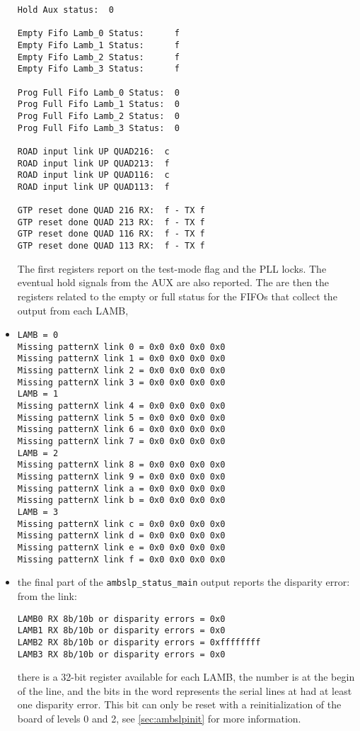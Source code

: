 \documentclass[UKenglish]{latex/atlasdoc}
\begin{document}
\begin{itemize}
\begin{verbatim}
Hold Aux status:  0

Empty Fifo Lamb_0 Status:      f
Empty Fifo Lamb_1 Status:      f
Empty Fifo Lamb_2 Status:      f
Empty Fifo Lamb_3 Status:      f

Prog Full Fifo Lamb_0 Status:  0
Prog Full Fifo Lamb_1 Status:  0
Prog Full Fifo Lamb_2 Status:  0
Prog Full Fifo Lamb_3 Status:  0

ROAD input link UP QUAD216:  c
ROAD input link UP QUAD213:  f
ROAD input link UP QUAD116:  c
ROAD input link UP QUAD113:  f

GTP reset done QUAD 216 RX:  f - TX f
GTP reset done QUAD 213 RX:  f - TX f
GTP reset done QUAD 116 RX:  f - TX f
GTP reset done QUAD 113 RX:  f - TX f
\end{verbatim}
	The first registers
	report on the test-mode flag and the PLL locks. The eventual hold signals from the 
	AUX are also reported. The are then the registers related to the empty or full 
	status for the FIFOs that collect the output from each LAMB, 
	
	\item 
\begin{verbatim}
LAMB = 0
Missing patternX link 0 = 0x0 0x0 0x0 0x0
Missing patternX link 1 = 0x0 0x0 0x0 0x0
Missing patternX link 2 = 0x0 0x0 0x0 0x0
Missing patternX link 3 = 0x0 0x0 0x0 0x0
LAMB = 1
Missing patternX link 4 = 0x0 0x0 0x0 0x0
Missing patternX link 5 = 0x0 0x0 0x0 0x0
Missing patternX link 6 = 0x0 0x0 0x0 0x0
Missing patternX link 7 = 0x0 0x0 0x0 0x0
LAMB = 2
Missing patternX link 8 = 0x0 0x0 0x0 0x0
Missing patternX link 9 = 0x0 0x0 0x0 0x0
Missing patternX link a = 0x0 0x0 0x0 0x0
Missing patternX link b = 0x0 0x0 0x0 0x0
LAMB = 3
Missing patternX link c = 0x0 0x0 0x0 0x0
Missing patternX link d = 0x0 0x0 0x0 0x0
Missing patternX link e = 0x0 0x0 0x0 0x0
Missing patternX link f = 0x0 0x0 0x0 0x0
\end{verbatim}

	\item the final part of the \texttt{ambslp\_status\_main} output
	reports the disparity error: from the link:
\begin{verbatim}
LAMB0 RX 8b/10b or disparity errors = 0x0
LAMB1 RX 8b/10b or disparity errors = 0x0
LAMB2 RX 8b/10b or disparity errors = 0xffffffff
LAMB3 RX 8b/10b or disparity errors = 0x0
\end{verbatim}
	there is a 32-bit register available for each LAMB, the number is at
	the begin of the line, and the bits in the word represents the serial
	lines at had at least one disparity error. This bit can only be reset
	with a reinitialization of the board of levels 0 and 2,
	 see \ref{sec:ambslpinit} for more information.
\end{itemize}
\end{document}
